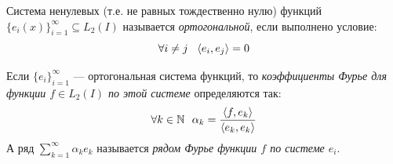 \begin{definition}
	Система ненулевых (т.е. не равных тождественно нулю) функций $\{e_i(x)\}_{i = 1}^\infty \subseteq L_2(I)$ называется \textit{ортогональной}, если выполнено условие:
	\[
		\forall i \neq j\ \ \left\langle e_i, e_j\right\rangle = 0
	\]
\end{definition}

\begin{definition}
	Если $\{e_i\}_{i = 1}^\infty$ --- ортогональная система функций, то \textit{коэффициенты Фурье для функции $f \in L_2(I)$ по этой системе} определяются так:
	\[
			\forall k \in \mathbb{N}\ \ \alpha_k = \frac{\left\langle f, e_k\right\rangle}{\left\langle e_k, e_k\right\rangle}
	\]
	А ряд $\sum_{k = 1}^\infty \alpha_k e_k$ называется \textit{рядом Фурье функции $f$ по системе $e_i$}.
\end{definition}


